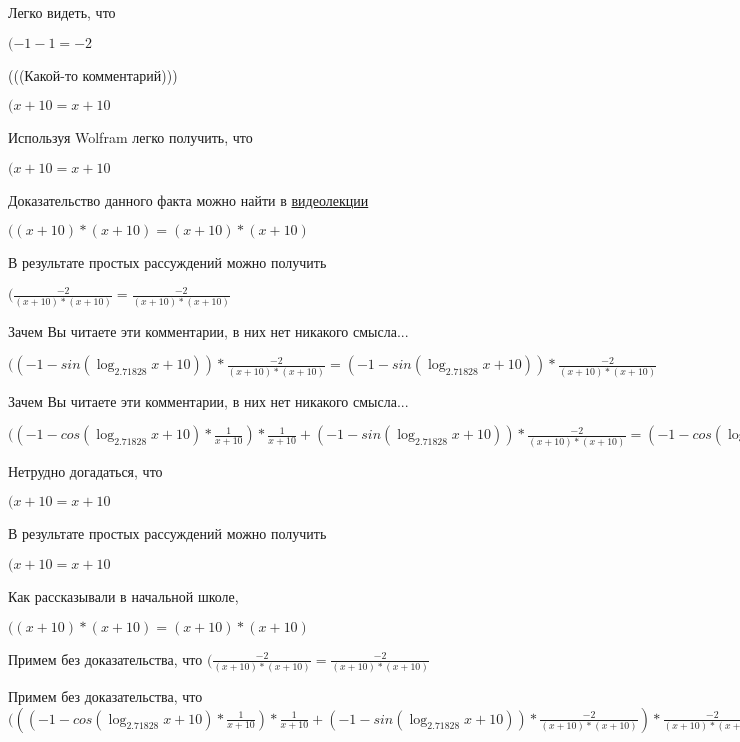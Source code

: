 \documentclass[12pt,a4paper,fleqn]{article}
\theoremstyle{definition}
\begin{document}
Легко видеть, что

$( -1  -  1  =  -2 $

(((Какой-то комментарий)))

$( x  +  10  =  x  +  10 $

Используя Wolfram легко получить, что

$( x  +  10  =  x  +  10 $

Доказательство данного факта можно найти в \href{https://www.youtube.com/watch?v=dQw4w9WgXcQ}{видеолекции}

$(( x  +  10 ) * ( x  +  10 ) = ( x  +  10 ) * ( x  +  10 )$

В результате простых рассуждений можно получить

$(\frac{ -2 }{( x  +  10 ) * ( x  +  10 )}
 = \frac{ -2 }{( x  +  10 ) * ( x  +  10 )}
$

Зачем Вы читаете эти комментарии, в них нет никакого смысла...

$(( -1  - sin(\log_{ 2.71828 }{ x  +  10 })) * \frac{ -2 }{( x  +  10 ) * ( x  +  10 )}
 = ( -1  - sin(\log_{ 2.71828 }{ x  +  10 })) * \frac{ -2 }{( x  +  10 ) * ( x  +  10 )}
$

Зачем Вы читаете эти комментарии, в них нет никакого смысла...

$(( -1  - cos(\log_{ 2.71828 }{ x  +  10 }) * \frac{ 1 }{ x  +  10 }
) * \frac{ 1 }{ x  +  10 }
 + ( -1  - sin(\log_{ 2.71828 }{ x  +  10 })) * \frac{ -2 }{( x  +  10 ) * ( x  +  10 )}
 = ( -1  - cos(\log_{ 2.71828 }{ x  +  10 }) * \frac{ 1 }{ x  +  10 }
) * \frac{ 1 }{ x  +  10 }
 + ( -1  - sin(\log_{ 2.71828 }{ x  +  10 })) * \frac{ -2 }{( x  +  10 ) * ( x  +  10 )}
$

Нетрудно догадаться, что

$( x  +  10  =  x  +  10 $

В результате простых рассуждений можно получить

$( x  +  10  =  x  +  10 $

Как рассказывали в начальной школе,

$(( x  +  10 ) * ( x  +  10 ) = ( x  +  10 ) * ( x  +  10 )$

Примем без доказательства, что
$(\frac{ -2 }{( x  +  10 ) * ( x  +  10 )}
 = \frac{ -2 }{( x  +  10 ) * ( x  +  10 )}
$

Примем без доказательства, что
$((( -1  - cos(\log_{ 2.71828 }{ x  +  10 }) * \frac{ 1 }{ x  +  10 }
) * \frac{ 1 }{ x  +  10 }
 + ( -1  - sin(\log_{ 2.71828 }{ x  +  10 })) * \frac{ -2 }{( x  +  10 ) * ( x  +  10 )}
) * \frac{ -2 }{( x  +  10 ) * ( x  +  10 )}
 = (( -1  - cos(\log_{ 2.71828 }{ x  +  10 }) * \frac{ 1 }{ x  +  10 }
) * \frac{ 1 }{ x  +  10 }
 + ( -1  - sin(\log_{ 2.71828 }{ x  +  10 })) * \frac{ -2 }{( x  +  10 ) * ( x  +  10 )}
) * \frac{ -2 }{( x  +  10 ) * ( x  +  10 )}
$
\end{document}
